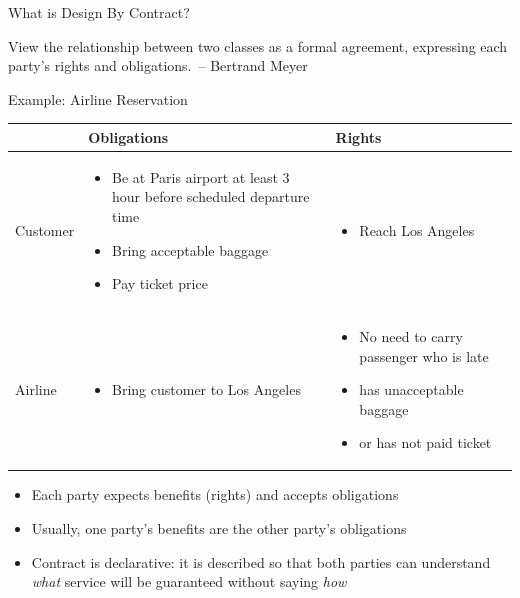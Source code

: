 \begin{frame}{What is Design By Contract?}
  \begin{boitequote}{}
    View the relationship between two classes as a formal agreement, expressing
    each party's rights and obligations.~\hfill{\rm -- Bertrand Meyer}
  \end{boitequote}

  \begin{block}{Example: Airline Reservation}
    \begin{tabular}{p{.15\linewidth}|p{.37\linewidth}|p{.37\linewidth}}\hline
      &Obligations&Rights\\\hline
      Customer&
      \begin{itemize}\vspace{-.8\baselineskip}
      \item Be at Paris airport at least 3 hour before scheduled departure time
      \item Bring acceptable baggage
      \item Pay ticket price
      \end{itemize}\vspace{-1.2\baselineskip}
      &
      \begin{itemize}\vspace{-.8\baselineskip}
      \item Reach Los Angeles
      \end{itemize}
      \\\hline
      Airline&
      \begin{itemize}\vspace{-.8\baselineskip}
      \item Bring customer to Los Angeles
      \end{itemize}
      &
      \begin{itemize}\vspace{-.8\baselineskip}
      \item No need to carry passenger who is late
      \item has unacceptable baggage
      \item or has not paid ticket
      \end{itemize}\vspace{-1.2\baselineskip}
    \end{tabular}
  \end{block}
  \begin{itemize}
  \item Each party expects benefits (rights) and accepts obligations
  \item Usually, one party's benefits are the other party's obligations
  \item Contract is declarative: it is described so that both parties can
    understand \textit{what} service will be guaranteed without saying
    \textit{how}
  \end{itemize}
\end{frame}

